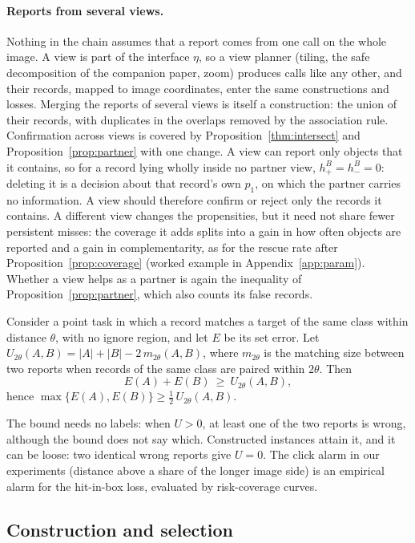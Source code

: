 \paragraph{Reports from several views.} Nothing in the chain assumes that a report comes from one call on the whole image. A view is part of the interface $\eta$, so a view planner (tiling, the safe decomposition of the companion paper, zoom) produces calls like any other, and their records, mapped to image coordinates, enter the same constructions and losses. Merging the reports of several views is itself a construction: the union of their records, with duplicates in the overlaps removed by the association rule. Confirmation across views is covered by Proposition~\ref{thm:intersect} and Proposition~\ref{prop:partner} with one change. A view can report only objects that it contains, so for a record lying wholly inside no partner view, $h_+^B=h_-^B=0$: deleting it is a decision about that record's own $p_1$, on which the partner carries no information. A view should therefore confirm or reject only the records it contains. A different view changes the propensities, but it need not share fewer persistent misses: the coverage it adds splits into a gain in how often objects are reported and a gain in complementarity, as for the rescue rate after Proposition~\ref{prop:coverage} (worked example in Appendix~\ref{app:param}). Whether a view helps as a partner is again the inequality of Proposition~\ref{prop:partner}, which also counts its false records.

\begin{proposition}\label{prop:alarm}
Consider a point task in which a record matches a target of the same class within distance $\theta$, with no ignore region, and let $E$ be its set error. Let $U_{2\theta}(A,B)=|A|+|B|-2\,m_{2\theta}(A,B)$, where $m_{2\theta}$ is the matching size between two reports when records of the same class are paired within $2\theta$. Then
\[
E(A)+E(B)\ \ge\ U_{2\theta}(A,B),
\]
hence $\max\{E(A),E(B)\}\ge\tfrac12\,U_{2\theta}(A,B)$.
\end{proposition}
The bound needs no labels: when $U>0$, at least one of the two reports is wrong, although the bound does not say which. Constructed instances attain it, and it can be loose: two identical wrong reports give $U=0$. The click alarm in our experiments (distance above a share of the longer image side) is an empirical alarm for the hit-in-box loss, evaluated by risk-coverage curves.

\subsection{Construction and selection}\label{sec:theory:select}

